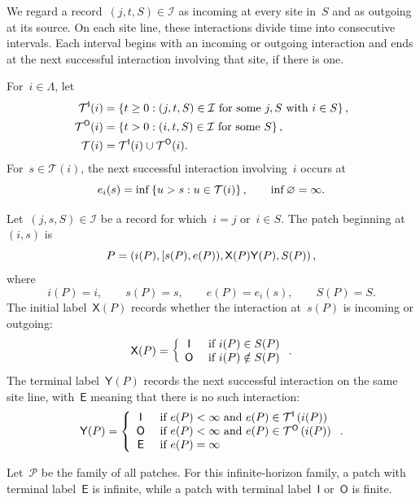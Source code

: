 We regard a record~$(j,t,S)\in\mathcal I$ as incoming at every site in~$S$ and
as outgoing at its source. On each site line, these interactions divide time
into consecutive intervals. Each interval begins with an incoming or outgoing
interaction and ends at the next successful interaction involving that site, if
there is one.

For~$i\in\Lambda$, let
\begin{align*}
\mathcal T^{\mathsf I}(i)
&=
\left\{t\geq0:(j,t,S)\in\mathcal I
  \text{ for some }j,S\text{ with }i\in S\right\},
\\
\mathcal T^{\mathsf O}(i)
&=
\left\{t>0:(i,t,S)\in\mathcal I\text{ for some }S\right\},
\\
\mathcal T(i)
&=
\mathcal T^{\mathsf I}(i)\cup\mathcal T^{\mathsf O}(i).
\end{align*}
For~$s\in\mathcal T(i)$, the next successful interaction involving~$i$ occurs
at
\begin{equation*}
e_i(s)=\inf\left\{u>s:u\in\mathcal T(i)\right\},
\qquad
\inf\varnothing=\infty.
\end{equation*}

\begin{definition}[Patch]
\label{def:patch}
Let~$(j,s,S)\in\mathcal I$ be a record for which~$i=j$ or~$i\in S$. The patch
beginning at~$(i,s)$ is
\begin{equation*}
P=
\left(i(P),[s(P),e(P)),\mathsf X(P)\mathsf Y(P),S(P)\right),
\end{equation*}
where
\begin{equation*}
i(P)=i,
\qquad
s(P)=s,
\qquad
e(P)=e_i(s),
\qquad
S(P)=S.
\end{equation*}
The initial label~$\mathsf X(P)$ records whether the interaction at~$s(P)$ is
incoming or outgoing:
\begin{equation*}
\mathsf X(P)=
\left\{\begin{array}{cl} \mathsf I &\text{ if } i(P)\in S(P) \\ \mathsf O &\text{ if } i(P)\notin S(P) \end{array}\right..
\end{equation*}
The terminal label~$\mathsf Y(P)$ records the next successful interaction on
the same site line, with~$\mathsf E$ meaning that there is no such interaction:
\begin{equation*}
\mathsf Y(P)=
\left\{\begin{array}{cl} \mathsf I &\text{ if } e(P)<\infty\text{ and }e(P)\in\mathcal T^{\mathsf I}\left(i(P)\right) \\ \mathsf O &\text{ if } e(P)<\infty\text{ and }e(P)\in\mathcal T^{\mathsf O}\left(i(P)\right) \\ \mathsf E &\text{ if } e(P)=\infty \end{array}\right..
\end{equation*}
\end{definition}

Let~$\mathcal P$ be the family of all patches. For this infinite-horizon family,
a patch with terminal label~$\mathsf E$ is infinite, while a patch with terminal
label~$\mathsf I$ or~$\mathsf O$ is finite.

